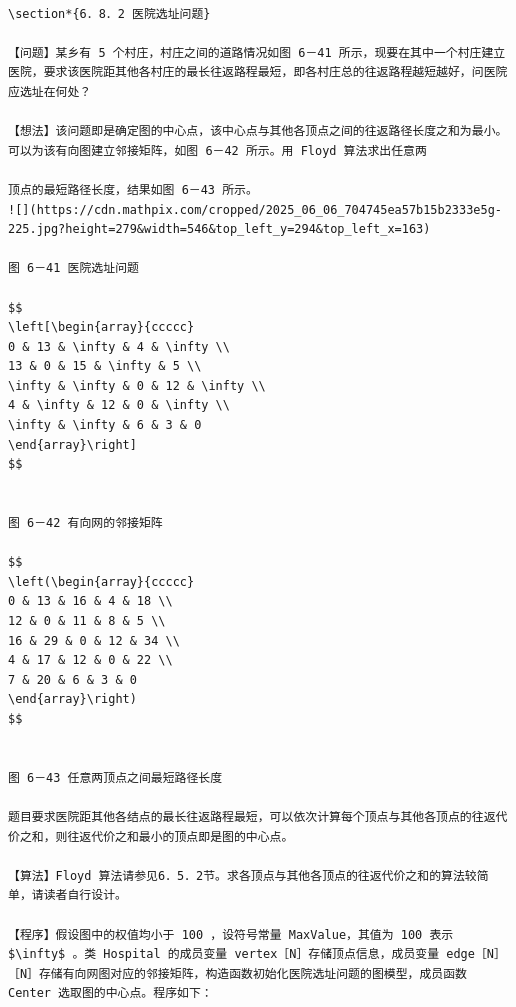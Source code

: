 \documentclass[10pt]{article}
\begin{document}
\begin{verbatim}

\section*{6．8．2 医院选址问题}

【问题】某乡有 5 个村庄，村庄之间的道路情况如图 6－41 所示，现要在其中一个村庄建立医院，要求该医院距其他各村庄的最长往返路程最短，即各村庄总的往返路程越短越好，问医院应选址在何处？

【想法】该问题即是确定图的中心点，该中心点与其他各顶点之间的往返路径长度之和为最小。可以为该有向图建立邻接矩阵，如图 6－42 所示。用 Floyd 算法求出任意两

顶点的最短路径长度，结果如图 6－43 所示。
![](https://cdn.mathpix.com/cropped/2025_06_06_704745ea57b15b2333e5g-225.jpg?height=279&width=546&top_left_y=294&top_left_x=163)

图 6－41 医院选址问题

$$
\left[\begin{array}{ccccc}
0 & 13 & \infty & 4 & \infty \\
13 & 0 & 15 & \infty & 5 \\
\infty & \infty & 0 & 12 & \infty \\
4 & \infty & 12 & 0 & \infty \\
\infty & \infty & 6 & 3 & 0
\end{array}\right]
$$


图 6－42 有向网的邻接矩阵

$$
\left(\begin{array}{ccccc}
0 & 13 & 16 & 4 & 18 \\
12 & 0 & 11 & 8 & 5 \\
16 & 29 & 0 & 12 & 34 \\
4 & 17 & 12 & 0 & 22 \\
7 & 20 & 6 & 3 & 0
\end{array}\right)
$$


图 6－43 任意两顶点之间最短路径长度

题目要求医院距其他各结点的最长往返路程最短，可以依次计算每个顶点与其他各顶点的往返代价之和，则往返代价之和最小的顶点即是图的中心点。

【算法】Floyd 算法请参见6．5．2节。求各顶点与其他各顶点的往返代价之和的算法较简单，请读者自行设计。

【程序】假设图中的权值均小于 100 ，设符号常量 MaxValue，其值为 100 表示 $\infty$ 。类 Hospital 的成员变量 vertex［N］存储顶点信息，成员变量 edge［N］［N］存储有向网图对应的邻接矩阵，构造函数初始化医院选址问题的图模型，成员函数 Center 选取图的中心点。程序如下：
\end{verbatim}
\end{document}
